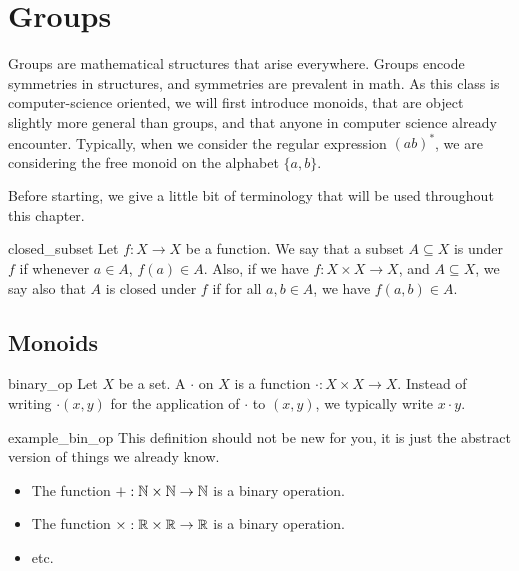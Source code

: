 \section{Groups}

Groups are mathematical structures that arise everywhere. Groups encode symmetries in structures, and symmetries are prevalent in math.  As this class is computer-science oriented, we will first introduce monoids, that are object slightly more general than groups, and that anyone in computer science already encounter. Typically, when we consider the regular expression \( (ab)^* \), we are considering the free monoid on the alphabet \( \{ a, b \} \). 

Before starting, we give a little bit of terminology that will be used throughout this chapter.
\begin{cdef}{}{closed_subset}
    Let \( f : X \to X \) be a function. We say that a subset \( A \subseteq X \) is  under \( f \) if whenever \( a \in A \), \( f(a) \in A \). Also, if we have \( f : X\times X \to X \), and \( A \subseteq X \), we say also that \( A \) is closed under \( f \) if for all \( a, b \in  A \), we have \( f(a, b) \in A \). 
\end{cdef}

\subsection{Monoids}

\begin{cdef}{}{binary_op}
    Let \( X \) be a set. A  \( \cdot \) on \( X \) is a function \( \cdot : X \times X \to X \). Instead of writing \( \cdot(x, y) \) for the application of \( \cdot \) to \( (x, y) \), we typically write \( x \cdot y \).
\end{cdef}

\begin{cexp}{}{example_bin_op}
    This definition should not be new for you, it is just the abstract version of things we already know. 
    \begin{itemize}
        \item The function \( + : \mathbb{N} \times \mathbb{N} \to \mathbb{N} \) is a binary operation.
        \item The function \( \times : \mathbb{R} \times \mathbb{R} \to \mathbb{R} \) is a binary operation.
        \item etc.
    \end{itemize}
\end{cexp}

